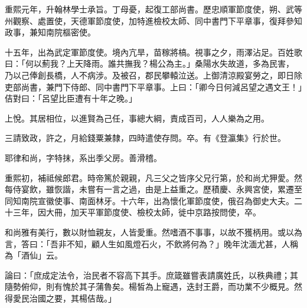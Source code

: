 \begin{pinyinscope}
 重熙元年，升翰林學士承旨。丁母憂，起復工部尚書。歷忠順軍節度使，朔、武等州觀察、處置使，天德軍節度使，加特進檢校太師、同中書門下平章事，復拜參知政事，兼知南院樞密使。



 十五年，出為武定軍節度使。境內亢旱，苗稼將槁。視事之夕，雨澤沾足。百姓歌曰：「何以薊我？上天降雨。誰共撫我？楊公為主。」桑陽水失故道，多為民害，
 乃以己俸創長橋，人不病涉。及被召，郡民攀轅泣送。上御清涼殿宴勞之，即日除吏部尚書，兼門下侍郎、同中書門下平章事。上曰：「卿今日何減呂望之遇文王！」佶對曰：「呂望比臣遭有十年之晚。」



 上悅。其居相位，以進賢為己任，事總大綱，責成百司，人人樂為之用。



 三請致政，許之，月給錢粟兼隸，四時遣使存問。卒。有《登瀛集》行於世。



 耶律和尚，字特抹，系出季父房。善滑稽。



 重熙初，補祗候郎君。時帝篤於親親，凡三父之皆序父兄行第，於和尚尤狎愛。然每侍宴飲，雖恢諧，未嘗有一言之過，由是上益重之。歷積慶、永興宮使，累遷至同知南院宣徽使事、南面林牙。十六年，出為懷化軍節度使，俄召為御史大夫。二十三年，因大冊，加天平軍節度使、檢校太師，徙中京路按問使，卒。



 和尚雅有美行，數以財恤親友，人皆愛重。然嗜酒不事事，以故不獲柄用。或以為言，答曰：「吾非不知，顧人生如風燈石火，不飲將何為？」晚年沈湎尤甚，人稱為「酒仙」云。



 論曰：「庶成定法令，治民者不容高下其手。庶箴雖嘗表請廣姓氏，以秩典禮；其隨勢俯仰，則有愧於其子蒲魯矣。楊皙為上寵遇，迭封王爵，而功業不少概見。然得愛民治國之要，其楊佶哉。」



\end{pinyinscope}